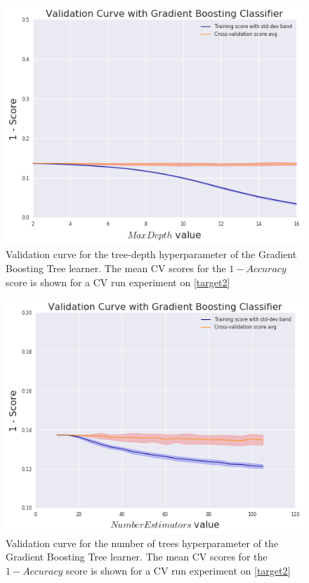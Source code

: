 \begin{figure}[h!]
    \begin{center}
        \includegraphics[width=1\linewidth]{figures/gradient-boosting/validation_curve_boosting_depth_series_f1}
        \caption{ Validation curve for the tree-depth hyperparameter of the Gradient Boosting Tree learner.
        The mean CV scores for the $1 - Accuracy$ score is shown for a CV run experiment on \cref{target2}}
        \label{fig:boosting_validation_curves_depth_trees}

    \end{center}
\end{figure}

\begin{figure}[h!]
    \begin{center}
        \includegraphics[width=1\linewidth]{figures/gradient-boosting/validation_curve_boosting_num_trees_series_f1}
            \caption{ Validation curve for the number of trees hyperparameter of the Gradient Boosting Tree learner. The mean CV scores for the $1 - Accuracy$ score is shown for a CV run experiment on \cref{target2}}
            \label{fig:boosting_validation_curves_num_trees}
    \end{center}
\end{figure}


